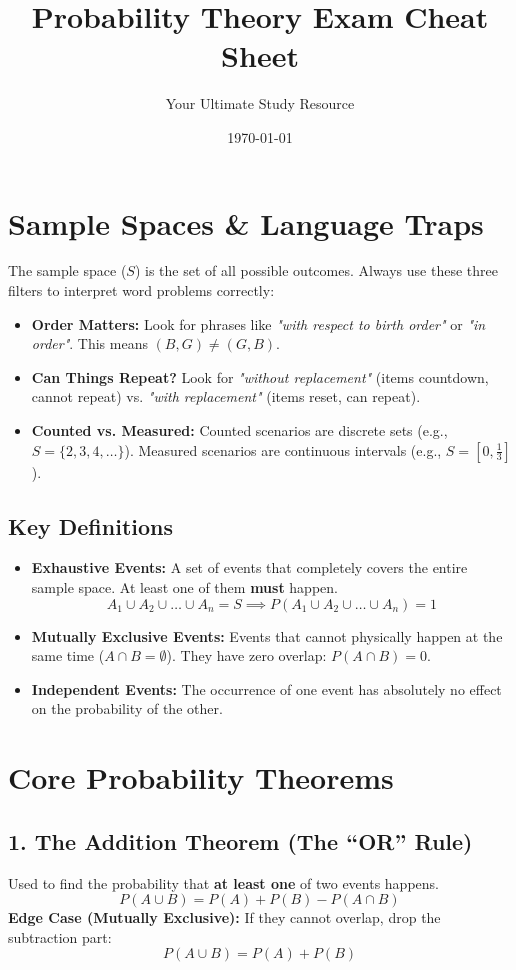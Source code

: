 \documentclass[11pt,a4paper]{article}
\title{\textbf{Probability Theory Exam Cheat Sheet}}
\author{Your Ultimate Study Resource}
\date{\today}
\begin{document}
\maketitle

\section{Sample Spaces \& Language Traps}
The sample space ($S$) is the set of all possible outcomes. Always use these three filters to interpret word problems correctly:
\begin{itemize}
    \item \textbf{Order Matters:} Look for phrases like \textit{"with respect to birth order"} or \textit{"in order"}. This means $(B, G) \neq (G, B)$.
    \item \textbf{Can Things Repeat?} Look for \textit{"without replacement"} (items countdown, cannot repeat) vs. \textit{"with replacement"} (items reset, can repeat).
    \item \textbf{Counted vs. Measured:} Counted scenarios are discrete sets (e.g., $S = \{2, 3, 4, \dots\}$). Measured scenarios are continuous intervals (e.g., $S = [0, \frac{1}{3}]$).
\end{itemize}

\subsection{Key Definitions}
\begin{itemize}
    \item \textbf{Exhaustive Events:} A set of events that completely covers the entire sample space. At least one of them \textbf{must} happen. 
    \[ A_1 \cup A_2 \cup \dots \cup A_n = S \implies P(A_1 \cup A_2 \cup \dots \cup A_n) = 1 \]
    \item \textbf{Mutually Exclusive Events:} Events that cannot physically happen at the same time ($A \cap B = \emptyset$). They have zero overlap: $P(A \cap B) = 0$.
    \item \textbf{Independent Events:} The occurrence of one event has absolutely no effect on the probability of the other.
\end{itemize}

\section{Core Probability Theorems}

\subsection{1. The Addition Theorem (The ``OR'' Rule)}
Used to find the probability that \textbf{at least one} of two events happens.
\[ P(A \cup B) = P(A) + P(B) - P(A \cap B) \]
\textbf{Edge Case (Mutually Exclusive):} If they cannot overlap, drop the subtraction part:
\[ P(A \cup B) = P(A) + P(B) \]
\end{document}

